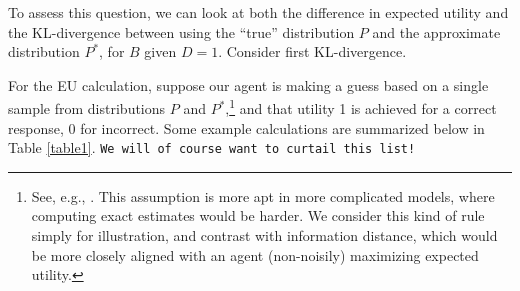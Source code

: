 \documentclass[10pt,letterpaper]{article}
\begin{document}
To assess this question, we can look at both the difference in expected utility and the KL-divergence between using the ``true'' distribution $P$ and the approximate distribution $P^*$, for $B$ given $D=1$. Consider first KL-divergence. 




For the EU calculation, suppose our agent is making a guess based on a single sample from distributions $P$ and $P^*$,\footnote{See, e.g., \citep{Vul2014}. This assumption is more apt in more complicated models, where computing exact estimates would be harder. We consider this kind of rule simply for illustration, and contrast with information distance, which would be more closely aligned with an agent (non-noisily) maximizing expected utility.} 
and that utility 1 is achieved for a correct response, 0 for incorrect. Some example calculations are summarized below in Table \ref{table1}. \texttt{We will of course want to curtail this list!}
\end{document}
